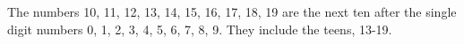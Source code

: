 The numbers 10, 11, 12, 13, 14, 15, 16, 17, 18, 19 are the next ten after the
single digit numbers 0, 1, 2, 3, 4, 5, 6, 7, 8, 9. They include the teens, 13-19.